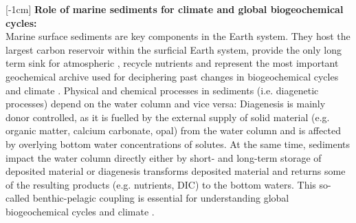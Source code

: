 \documentclass[gmd, manuscript]{copernicus}
\begin{document}
\introduction  %
[-1cm]%
\textbf{Role of marine sediments for climate and global biogeochemical cycles:}\\
Marine surface sediments are key components in the Earth system. They host the largest carbon reservoir within the surficial Earth system, provide the only long term sink for atmospheric , 
recycle nutrients and represent the most important geochemical archive used for deciphering past changes in biogeochemical cycles and climate  \citep[e.g.][]{berner:91, archer_effect_1994, ridgwell_role_2005, arndt_quantifying_2013}. 
Physical and chemical processes in sediments (i.e. diagenetic processes) depend on the water column and vice versa: Diagenesis is mainly donor controlled, as it is fuelled by the external supply of solid material 
(e.g. organic matter, calcium carbonate, opal) from the water column and is affected by overlying bottom water concentrations of solutes. 
At the same time, sediments impact the water column directly either by short- and long-term storage of deposited material or diagenesis transforms deposited material and returns some of the resulting products (e.g. nutrients, DIC) to the bottom waters. 
This so-called benthic-pelagic coupling is essential for understanding global biogeochemical cycles and climate \citep[e.g.][]{archer_effect_1994, archer_what_2000, soetaert_coupling_2000, mackenzie_sediments_2005}. 
\end{document}
